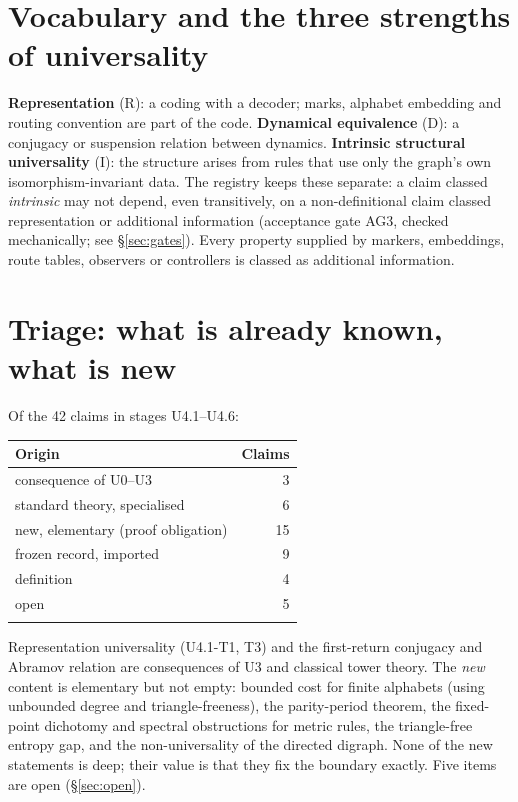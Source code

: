 \documentclass[11pt]{article}
\begin{document}
\section{Vocabulary and the three strengths of universality}
\textbf{Representation} (R): a coding with a decoder; marks, alphabet embedding and routing convention are part of the code. \textbf{Dynamical equivalence} (D): a conjugacy or suspension relation between dynamics. \textbf{Intrinsic structural universality} (I): the structure arises from rules that use only the graph's own isomorphism-invariant data. The registry keeps these separate: a claim classed \emph{intrinsic} may not depend, even transitively, on a non-definitional claim classed representation or additional information (acceptance gate AG3, checked mechanically; see \S\ref{sec:gates}). Every property supplied by markers, embeddings, route tables, observers or controllers is classed as additional information.

\section{Triage: what is already known, what is new}
Of the 42 claims in stages U4.1--U4.6:
\begin{center}\begin{tabular}{@{}lr@{}}\toprule Origin & Claims\\\midrule
consequence of U0--U3 & 3\\
standard theory, specialised & 6\\
new, elementary (proof obligation) & 15\\
frozen record, imported & 9\\
definition & 4\\
open & 5\\
\\\bottomrule\end{tabular}\end{center}
Representation universality (U4.1-T1, T3) and the first-return conjugacy and Abramov relation are consequences of U3 and classical tower theory. The \emph{new} content is elementary but not empty: bounded cost for finite alphabets (using unbounded degree and triangle-freeness), the parity-period theorem, the fixed-point dichotomy and spectral obstructions for metric rules, the triangle-free entropy gap, and the non-universality of the directed digraph. None of the new statements is deep; their value is that they fix the boundary exactly. Five items are open (\S\ref{sec:open}).
\end{document}
